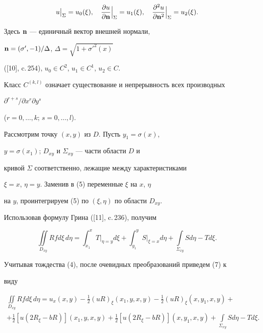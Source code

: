 \begin{equation}


u\big|_{\Sigma}=u_{0}(\xi),\quad


\frac{\partial u}{\partial \bold n}\Big|_{\Sigma}=u_{1}(\xi),


\quad


\frac{\partial^2 u}{\partial \bold n^2}\Big|_{\Sigma}=u_{2}(\xi).


\end{equation}


Здесь $\bold n$ --- единичный вектор внешней нормали,


$\bold n =(\sigma',-1)/\Delta$, $\Delta=\sqrt{1+{\sigma'}^{2}(x)}$


([10], c.\,254), $u_{0}\in C^{2}$, $u_{1}\in C^{1}$, $u_{2}\in C$.


Класс $C^{(k,l)}$ означает существование и непрерывность всех производных


$\partial^{r+s}/\partial x^{r} \partial y^{s}$


($r=0,\dotsc,k$; $s=0,\dotsc,l$).





Рассмотрим точку $(x,y)$ из $D$. Пусть $y_{1}=\sigma(x)$,


$y=\sigma(x_{1})$; $D_{xy}$ и $\Sigma_{xy}$ --- части области $D$ и


кривой $\Sigma$ соответственно, лежащие между характеристиками


$\xi=x$, $\eta=y$. Заменив в (5) переменные $\xi$ на $x$, $\eta$


на $y$, проинтегрируем (5) по $(\xi,\eta)$ по области $D_{xy}$.


Использовав формулу Грина ([11], c.\,236), получим


\begin{equation}


\iint\limits_{D_{xy}} Rfd\xi\, d\eta =


\int_{x_{1}}^{x} T\big|_{\eta=y} d\xi+


\int_{y_{1}}^{y} S\big|_{\xi=x} d\eta


+\int\limits_{\Sigma_{xy}} S d\eta - T d\xi .


\end{equation}


Учитывая тождества (4), после очевидных преобразований приведем (7) к


виду


\begin{multline}


\iint\limits_{D_{xy}} Rfd\xi\, d\eta =


u_{x}(x,y)-\frac{1}{2}(uR)_{\xi}(x_{1},y,x,y)-


\frac{1}{2}(uR)_{\xi}(x,y_{1},x,y)+ \\


+\frac{1}{2}[u(2R_{\xi}-bR)](x_{1},y,x,y)+


\frac{1}{2}[u(2R_{\xi}-bR)](x,y_{1},x,y)


+\int\limits_{\Sigma_{xy}} S d\eta - T d\xi .


\end{multline}


